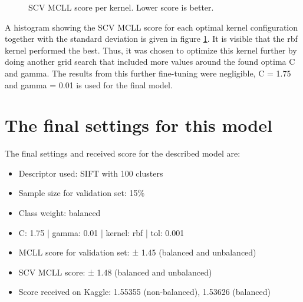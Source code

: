 \begin{figure}
    \centering
    \captionsetup{width=0.8\linewidth}
    \captionsetup{justification=centering}
    \caption{SCV MCLL score per kernel. \newline Lower score is better.}
    \label{fig:SVC_optima_w_std}
\end{figure}

A histogram showing the SCV MCLL score for each optimal kernel configuration together with the standard deviation is given in figure \ref{fig:SVC_optima_w_std}.
It is visible that the rbf kernel performed the best.
Thus, it was chosen to optimize this kernel further by doing another grid search that included more values around the found optima C and gamma.
The results from this further fine-tuning were negligible, C = 1.75 and gamma = 0.01 is used for the final model.


\section{The final settings for this model}
\label{section:svc_optimal}

The final settings and received score for the described model are:
\begin{itemize}
    \item Descriptor used: SIFT with 100 clusters
    \item Sample size for validation set: 15\%
    \item Class weight: balanced
    \item C:  1.75 | gamma: 0.01 | kernel: rbf | tol: 0.001
    \item MCLL score for validation set: ± 1.45 (balanced and unbalanced)
    \item SCV MCLL score: ± 1.48 (balanced and unbalanced)
    \item Score received on Kaggle: 1.55355 (non-balanced), 1.53626 (balanced)
\end{itemize}